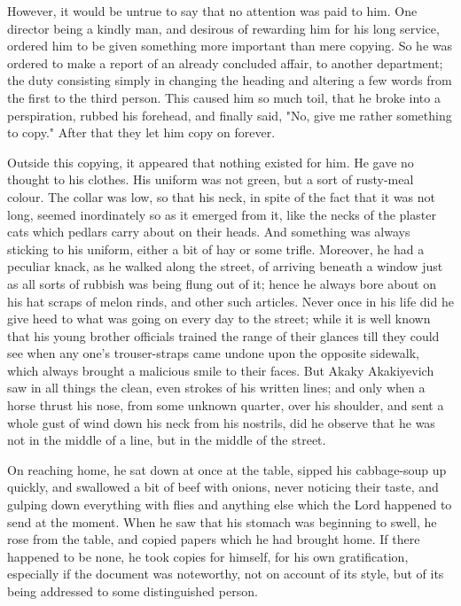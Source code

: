 However, it would be untrue to say that no attention was paid to him.
One director being a kindly man, and desirous of rewarding him for his
long service, ordered him to be given something more important than
mere copying. So he was ordered to make a report of an already
concluded affair, to another department; the duty consisting simply in
changing the heading and altering a few words from the first to the
third person. This caused him so much toil, that he broke into a
perspiration, rubbed his forehead, and finally said, "No, give me
rather something to copy." After that they let him copy on forever.

Outside this copying, it appeared that nothing existed for him. He
gave no thought to his clothes. His uniform was not green, but a sort
of rusty-meal colour. The collar was low, so that his neck, in spite
of the fact that it was not long, seemed inordinately so as it emerged
from it, like the necks of the plaster cats which pedlars carry about
on their heads. And something was always sticking to his uniform,
either a bit of hay or some trifle. Moreover, he had a peculiar knack,
as he walked along the street, of arriving beneath a window just as
all sorts of rubbish was being flung out of it; hence he always bore
about on his hat scraps of melon rinds, and other such articles. Never
once in his life did he give heed to what was going on every day to
the street; while it is well known that his young brother officials
trained the range of their glances till they could see when any one's
trouser-straps came undone upon the opposite sidewalk, which always
brought a malicious smile to their faces. But Akaky Akakiyevich saw in
all things the clean, even strokes of his written lines; and only when
a horse thrust his nose, from some unknown quarter, over his shoulder,
and sent a whole gust of wind down his neck from his nostrils, did he
observe that he was not in the middle of a line, but in the middle of
the street.

On reaching home, he sat down at once at the table, sipped his
cabbage-soup up quickly, and swallowed a bit of beef with onions,
never noticing their taste, and gulping down everything with flies and
anything else which the Lord happened to send at the moment. When he
saw that his stomach was beginning to swell, he rose from the table,
and copied papers which he had brought home. If there happened to be
none, he took copies for himself, for his own gratification,
especially if the document was noteworthy, not on account of its
style, but of its being addressed to some distinguished person.

